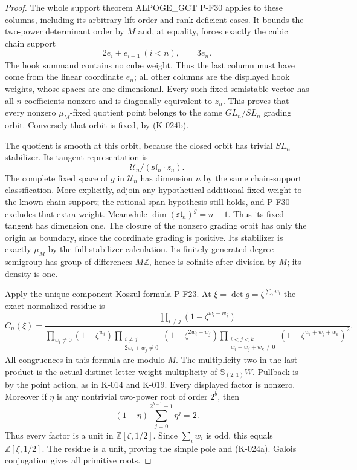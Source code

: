 \begin{proof}
The whole support theorem ALPOGE\_GCT P-F30 applies to these
columns, including its arbitrary-lift-order and rank-deficient
cases.  It bounds the two-power determinant order by $M$ and,
at equality, forces exactly the cubic chain support
\[
                 2e_i+e_{i+1}\ (i<n),\qquad3e_n.
\]
The hook summand contains no cube weight.  Thus the last column
must have come from the linear coordinate $e_n$; all other
columns are the displayed hook weights, whose spaces are
one-dimensional.  Every such fixed semistable vector has all
$n$ coefficients nonzero and is diagonally equivalent to $z_n$.
This proves that every nonzero $\mu_M$-fixed quotient point
belongs to the same $GL_n/SL_n$ grading orbit.  Conversely that
orbit is fixed, by (K-024b).

The quotient is smooth at this orbit, because the closed orbit
has trivial $SL_n$ stabilizer.  Its tangent representation is
\[
                  \mathcal U_n/(\mathfrak{sl}_n\cdot z_n).
\]
The complete fixed space of $g$ in $\mathcal U_n$ has dimension
$n$ by the same chain-support classification.  More explicitly,
adjoin any hypothetical additional fixed weight to the known
chain support; the rational-span hypothesis still holds, and
P-F30 excludes that extra weight.  Meanwhile
$\dim(\mathfrak{sl}_n)^g=n-1$.  Thus its fixed tangent has
dimension one.  The closure of the nonzero grading orbit has
only the origin as boundary, since the coordinate grading is
positive.  Its stabilizer is exactly $\mu_M$ by the full
stabilizer calculation.  Its finitely generated degree semigroup
has group of differences $M\mathbb Z$, hence is cofinite after
division by $M$; its density is one.

Apply the unique-component Koszul formula P-F23.  At
$\xi=\det g=\zeta^{\sum_iw_i}$ the exact normalized residue is
\[
 C_n(\xi)=
 \frac{\displaystyle\prod_{i\ne j}(1-\zeta^{w_i-w_j})}
 {\displaystyle
  \prod_{w_i\ne0}(1-\zeta^{w_i})
  \prod_{\substack{i\ne j\\2w_i+w_j\ne0}}
                          (1-\zeta^{2w_i+w_j})
  \prod_{\substack{i<j<k\\w_i+w_j+w_k\ne0}}
                          (1-\zeta^{w_i+w_j+w_k})^2}.
                                                               \tag{K-024c}
\]
All congruences in this formula are modulo $M$.  The multiplicity
two in the last product is the actual distinct-letter weight
multiplicity of $\mathbb S_{(2,1)}W$.  Pullback is by the point
action, as in K-014 and K-019.
Every displayed factor is nonzero.  Moreover if $\eta$ is any
nontrivial two-power root of order $2^b$, then
\[
                 (1-\eta)\sum_{j=0}^{2^{b-1}-1}\eta^j=2.
\]
Thus every factor is a unit in $\mathbb Z[\zeta,1/2]$.
Since $\sum_iw_i$ is odd, this equals
$\mathbb Z[\xi,1/2]$.  The residue is a unit, proving the simple
pole and (K-024a).  Galois conjugation gives all primitive roots.


\end{proof}
